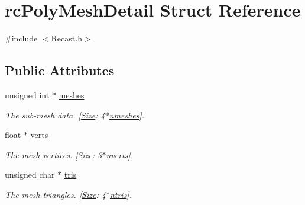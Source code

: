 \hypertarget{structrcPolyMeshDetail}{}\section{rc\+Poly\+Mesh\+Detail Struct Reference}
\label{structrcPolyMeshDetail}


{\ttfamily \#include $<$Recast.\+h$>$}

\subsection*{Public Attributes}
\begin{DoxyCompactItemize}
\item 
\mbox{\label{structrcPolyMeshDetail_af276db64c254f2ac9f6b7e8cac73a6e9}} 
unsigned int $\ast$ \hyperlink{structrcPolyMeshDetail_af276db64c254f2ac9f6b7e8cac73a6e9}{meshes}
\begin{DoxyCompactList}\small\item\em The sub-\/mesh data. \mbox{[}\hyperlink{classSize}{Size}\+: 4$\ast$\hyperlink{structrcPolyMeshDetail_afbe7e21cf0f9dca429c6762f457f61b6}{nmeshes}\mbox{]}. \end{DoxyCompactList}\item 
\mbox{\label{structrcPolyMeshDetail_acf351fccd62abd3efa10a97d396ced6d}} 
float $\ast$ \hyperlink{structrcPolyMeshDetail_acf351fccd62abd3efa10a97d396ced6d}{verts}
\begin{DoxyCompactList}\small\item\em The mesh vertices. \mbox{[}\hyperlink{classSize}{Size}\+: 3$\ast$\hyperlink{structrcPolyMeshDetail_a5424a45b24c43d49d93d89e89f11b59f}{nverts}\mbox{]}. \end{DoxyCompactList}\item 
\mbox{\label{structrcPolyMeshDetail_af52b9bd3ee62a11898a1bdbc7851e7e3}} 
unsigned char $\ast$ \hyperlink{structrcPolyMeshDetail_af52b9bd3ee62a11898a1bdbc7851e7e3}{tris}
\begin{DoxyCompactList}\small\item\em The mesh triangles. \mbox{[}\hyperlink{classSize}{Size}\+: 4$\ast$\hyperlink{structrcPolyMeshDetail_a80041af5ae32e618d4980cd81a08c9e3}{ntris}\mbox{]}. \end{DoxyCompactList}\item 

\end{DoxyCompactItemize}

